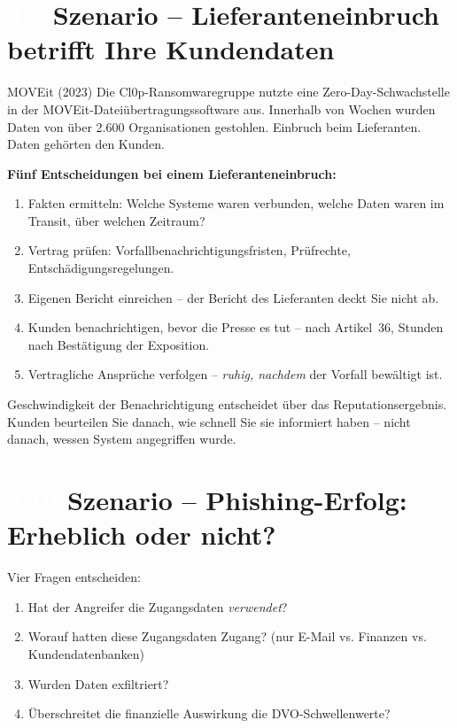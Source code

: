 \documentclass[11pt,a4paper,twoside]{book}
\newcommand{\lessontag}[1]{%
  \texorpdfstring{%
    \setlength{\fboxsep}{3pt}\colorbox{nisd2blue}{\textcolor{white}{\footnotesize\bfseries #1}}\quad%
  }{Lektion #1\ }%
}
\begin{document}
\section{\lessontag{3.9}Szenario -- Lieferanteneinbruch betrifft Ihre Kundendaten}

\begin{casestudy}{MOVEit (2023)}
Die Cl0p-Ransomwaregruppe nutzte eine Zero-Day-Schwachstelle in der MOVEit-Dateiübertragungssoftware aus. Innerhalb von Wochen wurden Daten von über 2.600 Organisationen gestohlen. Einbruch beim Lieferanten. Daten gehörten den Kunden.
\end{casestudy}

\textbf{Fünf Entscheidungen bei einem Lieferanteneinbruch:}

\begin{enumerate}
  \item Fakten ermitteln: Welche Systeme waren verbunden, welche Daten waren im Transit, über welchen Zeitraum?
  \item Vertrag prüfen: Vorfallbenachrichtigungsfristen, Prüfrechte, Entschädigungsregelungen.
  \item Eigenen Bericht einreichen -- der Bericht des Lieferanten deckt Sie nicht ab.
  \item Kunden benachrichtigen, bevor die Presse es tut -- nach Artikel~36, Stunden nach Bestätigung der Exposition.
  \item Vertragliche Ansprüche verfolgen -- \emph{ruhig, nachdem} der Vorfall bewältigt ist.
\end{enumerate}

Geschwindigkeit der Benachrichtigung entscheidet über das Reputationsergebnis. Kunden beurteilen Sie danach, wie schnell Sie sie informiert haben -- nicht danach, wessen System angegriffen wurde.

\section{\lessontag{3.10}Szenario -- Phishing-Erfolg: Erheblich oder nicht?}

Vier Fragen entscheiden:

\begin{enumerate}
  \item Hat der Angreifer die Zugangsdaten \emph{verwendet}?
  \item Worauf hatten diese Zugangsdaten Zugang? (nur E-Mail vs. Finanzen vs. Kundendatenbanken)
  \item Wurden Daten exfiltriert?
  \item Überschreitet die finanzielle Auswirkung die DVO-Schwellenwerte?
\end{enumerate}
\end{document}
